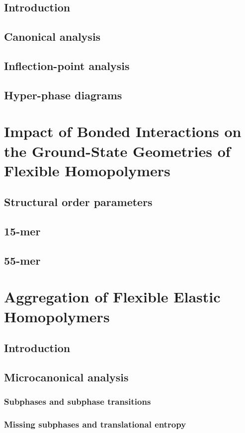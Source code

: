 \documentclass[12pt]{report}
\begin{document}
\section{Introduction}
\section{Canonical analysis}
\section{Inflection-point analysis}
\section{Hyper-phase diagrams}

\chapter{Impact of Bonded Interactions on the Ground-State Geometries of Flexible Homopolymers}
\section{Structural order parameters}
\section{15-mer}
\section{55-mer}

\chapter{Aggregation of Flexible Elastic Homopolymers}
\section{Introduction}
\section{Microcanonical analysis}
\subsection{Subphases and subphase transitions}
\subsection{Missing subphases and translational entropy}
\end{document}
